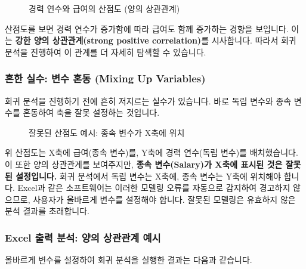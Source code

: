 \documentclass[11pt,a4paper]{article}
\theoremstyle{definition}
\begin{document}
\begin{figure}[h!]
    \centering
    \caption{경력 연수와 급여의 산점도 (양의 상관관계)}
    \label{fig:positive_correlation_scatter}
\end{figure}
\begin{tcolorbox}[colback=lightblue,colframe=darkblue,title={산점도 분석: 양의 상관관계}]
산점도를 보면 경력 연수가 증가함에 따라 급여도 함께 증가하는 경향을 보입니다. 이는 \textbf{강한 양의 상관관계(strong positive correlation)}를 시사합니다. 따라서 회귀 분석을 진행하여 이 관계를 더 자세히 탐색할 수 있습니다.
\end{tcolorbox}

\subsubsection{흔한 실수: 변수 혼동 (Mixing Up Variables)}
회귀 분석을 진행하기 전에 흔히 저지르는 실수가 있습니다. 바로 독립 변수와 종속 변수를 혼동하여 축을 잘못 설정하는 것입니다.

\begin{figure}[h!]
    \centering
    \caption{잘못된 산점도 예시: 종속 변수가 X축에 위치}
    \label{fig:wrong_scatter_plot}
\end{figure}
\begin{cautionbox}
위 산점도는 X축에 급여(종속 변수)를, Y축에 경력 연수(독립 변수)를 배치했습니다. 이 또한 양의 상관관계를 보여주지만, \textbf{종속 변수(Salary)가 X축에 표시된 것은 잘못된 설정입니다.} 회귀 분석에서 독립 변수는 X축에, 종속 변수는 Y축에 위치해야 합니다. Excel과 같은 소프트웨어는 이러한 모델링 오류를 자동으로 감지하여 경고하지 않으므로, 사용자가 올바르게 변수를 설정해야 합니다. 잘못된 모델링은 유효하지 않은 분석 결과를 초래합니다.
\end{cautionbox}

\subsubsection{Excel 출력 분석: 양의 상관관계 예시}
올바르게 변수를 설정하여 회귀 분석을 실행한 결과는 다음과 같습니다.
\end{document}
